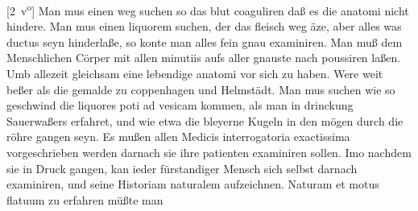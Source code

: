 [2~v\textsuperscript{o}]
\pend%
\pstart%
Man mus einen weg suchen so das blut\protect{} coaguliren
%
da{\ss} es die anatomi\protect{} nicht hindere.
\pend%
\pstart%
Man mus einen liquorem\protect{} suchen, der das fleisch\protect{} weg \"{a}ze, aber alles was ductus\protect{} seyn hinderla{\ss}e, so konte man alles fein gnau examiniren.
\pend%
\pstart%
Man mu{\ss} dem Menschlichen C\"{o}rper mit allen minutiis aufs aller gnauste nach poussiren la{\ss}en. Umb allezeit gleichsam eine lebendige anatomi\protect{} vor sich zu haben. Were weit be{\ss}er als die gemalde zu coppenhagen\protect{} und Helmst\"{a}dt\protect{}.
\pend%
\pstart%
Man mus suchen wie so geschwind die liquores\protect{} poti ad vesicam\protect{} kommen, als man in drinckung Sauerwa{\ss}ers\protect{} erfahret, und wie etwa die bleyerne Kugeln in den
%
m\"{o}gen durch die r\"{o}hre gangen seyn.
\pend%
\pstart%
Es mu{\ss}en allen Medicis\protect{} interrogatoria exactissima vorgeschrieben werden darnach sie ihre patienten\protect{} examiniren sollen.
\pend%
\pstart%
Imo nachdem sie in Druck gangen, kan ieder f\"{u}rstandiger
Mensch sich selbst darnach examiniren, und seine Historiam naturalem\protect{} aufzeichnen.
\pend%
\pstart%
Naturam et motus flatuum\protect{} zu erfahren m\"{u}{\ss}te man
